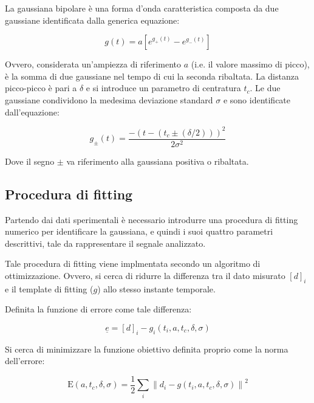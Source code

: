 \begin{figure}
		\centering
		\footnotesize{ \def\svgwidth{0.95\linewidth}
			}
	\caption{}
	\label{fig:gaussiana}
\end{figure}


La gaussiana bipolare è una forma d'onda caratteristica composta da due gaussiane identificata dalla generica equazione:

\begin{equation}
	g(t)=a\left[e^{g_{+}(t)}-e^{g_{-}(t)}\right]
\end{equation}

Ovvero, considerata un'ampiezza di riferimento $a$ (i.e. il valore massimo di picco), è la somma di due gaussiane nel tempo di cui la seconda ribaltata. La distanza picco-picco è pari a $\delta$ e si introduce un parametro di centratura $t_c$. Le due gaussiane condividono la medesima deviazione standard $\sigma$ e sono identificate dall'equazione:

\begin{equation}
	g_{\pm}(t)=\frac{-\left(t-\left(t_{c} \pm(\delta / 2)\right)\right)^{2}}{2 \sigma^{2}}
\end{equation}

Dove il segno $\pm$ va riferimento alla gaussiana positiva o ribaltata.

\subsection{Procedura di fitting}

Partendo dai dati sperimentali è necessario introdurre una procedura di fitting numerico per identificare la gaussiana, e quindi i suoi quattro parametri descrittivi, tale da rappresentare il segnale analizzato.

Tale procedura di fitting viene implmentata secondo un algoritmo di ottimizzazione. Ovvero, si cerca di ridurre la differenza tra il dato misurato $[d]_i$ e il template di fitting ($g$) allo stesso instante temporale. 

Definita la funzione di errore come tale differenza:

\begin{equation}
	\underline{e}=[d]_{i}-g_{i}\left(t_{i}, a,t_c,\delta,\sigma\right)
\end{equation}

Si cerca di minimizzare la funzione obiettivo definita proprio come la norma dell'errore:

\begin{equation}
	\mathrm{E}(a,t_c,\delta,\sigma) = \frac{1}{2} \sum_{i}\left\|d_{i}-g\left(t_{i},a,t_c,\delta,\sigma\right)\right\|^{2}
\end{equation}


